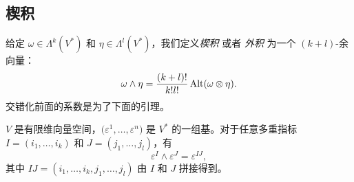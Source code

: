\subsection{楔积}

给定 $\omega\in \Lambda^k(V^*)$ 和 $\eta\in \Lambda^l(V^*)$，我们定义\emph{楔积}
或者 \emph{外积} 为一个 $(k+l)$-余向量：
\begin{equation}
  \omega\wedge\eta=\frac{(k+l)!}{k!l!}\operatorname{Alt}(\omega\otimes\eta).
\end{equation}
交错化前面的系数是为了下面的引理。

\begin{lemma}
  $V$ 是有限维向量空间，$\bigl(\varepsilon^1,\dots,\varepsilon^n\bigr)$
  是 $V^*$ 的一组基。对于任意多重指标 $I=(i_1,\dots,i_k)$ 和
  $J=(j_1,\dots,j_l)$，有
  \[
    \varepsilon^I\wedge\varepsilon^J=\varepsilon^{IJ},  
  \]
  其中 $IJ=(i_1,\dots,i_k,j_1,\dots,j_l)$ 由 $I$ 和 $J$ 拼接得到。
\end{lemma} 
